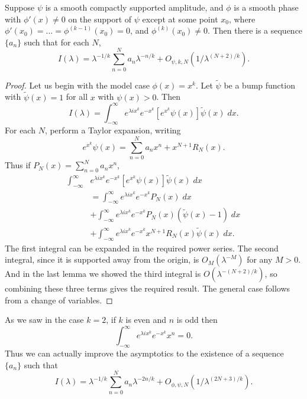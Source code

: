 \begin{theorem}
  Suppose $\psi$ is a smooth compactly supported amplitude, and $\phi$ is a smooth phase with $\phi'(x) \neq 0$ on the support of $\psi$ except at some point $x_0$, where $\phi'(x_0) = \dots = \phi^{(k-1)}(x_0) = 0$, and $\phi^{(k)}(x_0) \neq 0$. Then there is a sequence $\{ a_n \}$ such that for each $N$,
  \[ I(\lambda) = \lambda^{-1/k} \sum_{n = 0}^N a_n \lambda^{-n/k} + O_{\psi,k,N} \left( 1/\lambda^{(N+2)/k} \right). \]
\end{theorem}
\begin{proof}
  Let us begin with the model case $\phi(x) = x^k$. Let $\tilde{\psi}$ be a bump function with $\tilde{\psi}(x) = 1$ for all $x$ with $\psi(x) > 0$. Then
  \[ I(\lambda) = \int_{-\infty}^\infty e^{\lambda i x^k} e^{-x^k} [e^{x^k} \psi(x)] \tilde{\psi}(x)\; dx. \]
  For each $N$, perform a Taylor expansion, writing
  \[ e^{x^k} \psi(x) = \sum_{n = 0}^N a_n x^n + x^{N+1} R_N(x). \]
  Thus if $P_N(x) = \sum_{n = 0}^N a_n x^n$,
  \begin{align*}
    \int_{-\infty}^\infty &e^{\lambda i x^k} e^{-x^k} [e^{x^k} \psi(x)] \tilde{\psi}(x)\; dx\\
    & = \int_{-\infty}^\infty e^{\lambda i x^k} e^{-x^k} P_N(x)\; dx\\
    & + \int_{-\infty}^\infty e^{\lambda i x^k} e^{-x^k} P_N(x) (\tilde{\psi}(x) - 1)\; dx\\
    & + \int_{-\infty}^\infty e^{\lambda i x^k} e^{-x^k} x^{N+1} R_N(x) \tilde{\psi}(x)\; dx.
  \end{align*}
  The first integral can be expanded in the required power series. The second integral, since it is supported away from the origin, is $O_M(\lambda^{-M})$ for any $M > 0$. And in the last lemma we showed the third integral is $O(\lambda^{-(N+2)/k})$, so combining these three terms gives the required result. The general case follows from a change of variables.
\end{proof}

\begin{remark}
  As we saw in the case $k = 2$, if $k$ is even and $n$ is odd then
  \[ \int_{-\infty}^\infty e^{\lambda i x^k} e^{-x^k} x^n = 0. \]
  Thus we can actually improve the asymptotics to the existence of a sequence $\{ a_n \}$ such that
  \[ I(\lambda) = \lambda^{-1/k} \sum_{n = 0}^N a_n \lambda^{-2n/k} + O_{\phi,\psi,N} \left( 1 / \lambda^{(2N + 3)/k} \right). \]
\end{remark}

